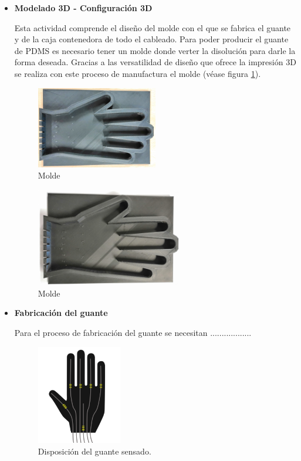\begin{itemize}
	\item \textbf{Modelado 3D - Configuración 3D}
	
	Esta actividad comprende el diseño del molde con el que se fabrica el guante y de la caja contenedora de todo el cableado.
	Para poder producir el guante de PDMS es necesario tener un molde donde verter la disolución para darle la forma deseada. Gracias a las versatilidad de diseño que ofrece la impresión 3D se realiza con este proceso de manufactura el molde (véase figura \ref{fig:molde}). 
\begin{figure}[H]
	\centering
	\includegraphics[width=0.5\textwidth]{./img/molde1}
	\caption{Molde} \label{fig:molde}
\end{figure}

	\begin{figure}[H]
		\centering
		\includegraphics[width=0.6\textwidth]{./img/molde2}
		\caption{Molde} \label{fig:molde2}
	\end{figure}
 
	\item \textbf{Fabricación del guante}
	
	Para el proceso de fabricación del guante se necesitan ..................
	
	
	\begin{figure}[H]
		\centering
		\includegraphics[width=0.35\textwidth]{./img/diagramaMano}
		\caption{Disposición del guante sensado.} \label{fig:manoFBG}
	\end{figure}
	

\end{itemize}
